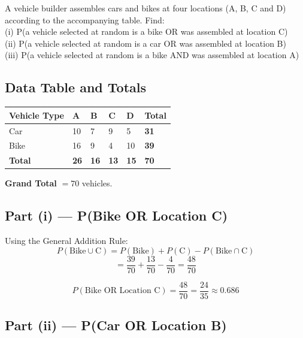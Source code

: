 \documentclass[12pt]{article}
\newcommand{\hcell}[1]{\textbf{\color{white}#1}}
\begin{document}
\begin{problembox}
A vehicle builder assembles cars and bikes at four locations (A, B, C and D) according to the accompanying table. Find:\\
(i) P(a vehicle selected at random is a bike OR was assembled at location C)\\
(ii) P(a vehicle selected at random is a car OR was assembled at location B)\\
(iii) P(a vehicle selected at random is a bike AND was assembled at location A)
\end{problembox}

\subsection*{Data Table and Totals}

\begin{center}
\begin{tabular}{C{2.8cm} C{1.5cm} C{1.5cm} C{1.5cm} C{1.5cm} C{1.8cm}}
\toprule
{}
\hcell{Vehicle Type} & \hcell{A} & \hcell{B} & \hcell{C} & \hcell{D} & \hcell{Total} \\
\midrule
{}
Car & 10 & 7 & 9 & 5 & \textbf{31} \\
Bike & 16 & 9 & 4 & 10 & \textbf{39} \\
\midrule
{}
\hcell{Total} & \hcell{26} & \hcell{16} & \hcell{13} & \hcell{15} & \hcell{70} \\
\bottomrule
\end{tabular}
\end{center}

\vspace{8pt}
\noindent\textbf{Grand Total} $= 70$ vehicles.

\subsection*{Part (i) --- P(Bike OR Location C)}

Using the General Addition Rule:
\[
  P(\text{Bike} \cup \text{C}) = P(\text{Bike}) + P(\text{C}) - P(\text{Bike} \cap \text{C})
\]
\[
  = \frac{39}{70} + \frac{13}{70} - \frac{4}{70}
  = \frac{48}{70}
\]

\begin{answerbox}
\[
  P(\text{Bike OR Location C}) = \frac{48}{70} = \frac{24}{35} \approx \mathbf{0.686}
\]
\end{answerbox}

\subsection*{Part (ii) --- P(Car OR Location B)}
\end{document}
